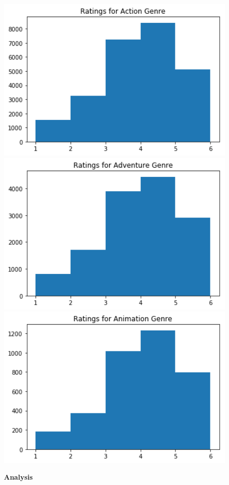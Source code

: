\begin{center}
	\includegraphics[width=12cm]{Pictures/Basic_action}
	\includegraphics[width=12cm]{Pictures/Basic_adventure}
	\includegraphics[width=12cm]{Pictures/Basic_animation}
\end{center}
\newpage
\noindent\textbf{Analysis}\\
